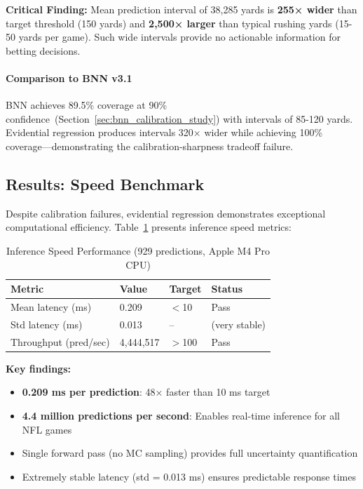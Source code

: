 \noindent \textbf{Critical Finding:} Mean prediction interval of 38,285 yards is \textbf{255× wider} than target threshold (150 yards) and \textbf{2,500× larger} than typical rushing yards (15-50 yards per game). Such wide intervals provide no actionable information for betting decisions.

\paragraph{Comparison to BNN v3.1} BNN achieves 89.5\% coverage at 90\% confidence~(Section~\ref{sec:bnn_calibration_study}) with intervals of 85-120 yards. Evidential regression produces intervals 320× wider while achieving 100\% coverage—demonstrating the calibration-sharpness tradeoff failure.

\subsection{Results: Speed Benchmark}

Despite calibration failures, evidential regression demonstrates exceptional computational efficiency. Table~\ref{tab:evidential_speed} presents inference speed metrics:

\begin{table}[htbp]
\centering
\caption{Inference Speed Performance (929 predictions, Apple M4 Pro CPU)}
\label{tab:evidential_speed}
\begin{tabular}{llll}
\toprule
\textbf{Metric} & \textbf{Value} & \textbf{Target} & \textbf{Status} \\
\midrule
Mean latency (ms) & 0.209 & $<$10 & Pass \\
Std latency (ms) & 0.013 & -- & (very stable) \\
Throughput (pred/sec) & 4,444,517 & $>$100 & Pass \\
\bottomrule
\end{tabular}
\end{table}

\noindent \textbf{Key findings:}
\begin{itemize}[nosep]
    \item \textbf{0.209 ms per prediction}: 48× faster than 10 ms target
    \item \textbf{4.4 million predictions per second}: Enables real-time inference for all NFL games
    \item Single forward pass (no MC sampling) provides full uncertainty quantification
    \item Extremely stable latency (std = 0.013 ms) ensures predictable response times
\end{itemize}

